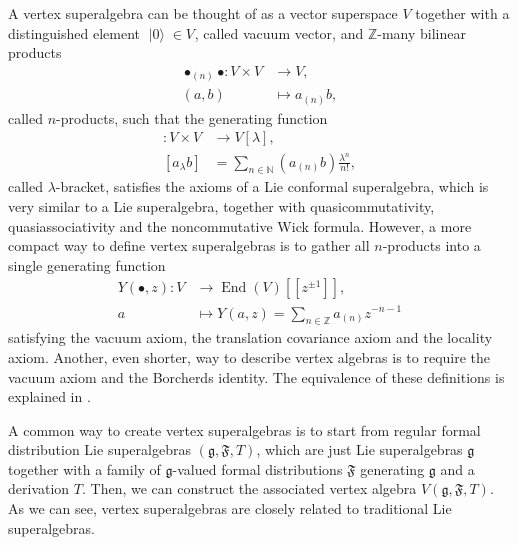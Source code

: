 \documentclass[a4paper, 12pt, reqno]{amsart}
\theoremstyle{remark}
\DeclareMathOperator{\End}{End}
\DeclareMathOperator{\vac}{|0\rangle}
\DeclareMathOperator{\zero}{\overline{0}}
\begin{document}
A vertex superalgebra can be thought of as a vector superspace $V$ together with a distinguished element $\vac \in V_{\zero}$, called vacuum vector, and $\mathbb{Z}$-many bilinear products
\begin{align*}
  \bullet_{(n)}\bullet: V \times V &\to V, \\
  (a, b) &\mapsto a_{(n)}b,
\end{align*}
called $n$-products, such that the generating function
\begin{align*}
  [\bullet_{\lambda}\bullet]: V \times V &\to V[\lambda], \\
  [a_{\lambda}b] &= \sum_{n \in \mathbb{N}}(a_{(n)}b)\frac{\lambda^n}{n!},
\end{align*}
called $\lambda$-bracket, satisfies the axioms of a Lie conformal superalgebra, which is very similar to a Lie superalgebra, together with quasicommutativity, quasiassociativity and the noncommutative Wick formula.
However, a more compact way to define vertex superalgebras is to gather all $n$-products into a single generating function
\begin{align*}
  Y(\bullet, z): V &\to \End(V)[[z^{\pm 1}]], \\
  a &\mapsto Y(a, z) = \sum_{n \in \mathbb{Z}}a_{(n)}z^{-n - 1}
\end{align*}
satisfying the vacuum axiom, the translation covariance axiom and the locality axiom.
Another, even shorter, way to describe vertex algebras is to require the vacuum axiom and the Borcherds identity.
The equivalence of these definitions is explained in \cite[\S1]{de_sole_finite_2006}.

A common way to create vertex superalgebras is to start from regular formal distribution Lie superalgebras $(\mathfrak{g}, \mathfrak{F}, T)$, which are just Lie superalgebras $\mathfrak{g}$ together with a family of $\mathfrak{g}$-valued formal distributions $\mathfrak{F}$ generating $\mathfrak{g}$ and a derivation $T$.
Then, we can construct the associated vertex algebra $V(\mathfrak{g}, \mathfrak{F}, T)$.
As we can see, vertex superalgebras are closely related to traditional Lie superalgebras.
\end{document}
